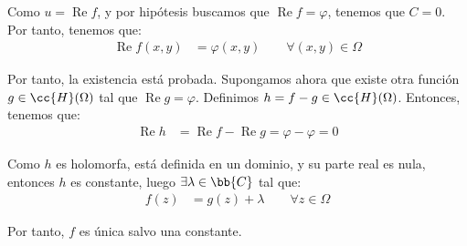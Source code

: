 \documentclass[12pt]{article}
\renewcommand{\Re}{\operatorname{Re}} %
\begin{document}
\begin{ejercicio}[3 puntos]
\begin{enumerate}
        Como $u=\Re f$, y por hipótesis buscamos que $\Re f = \varphi$, tenemos que $C=0$. Por tanto, tenemos que:
        \begin{align*}
            \Re f(x,y) &= \varphi(x,y)\qquad \forall (x,y) \in \Omega
        \end{align*}


        Por tanto, la existencia está probada. Supongamos ahora que existe otra función $g\in \cc{H}(\Omega)$ tal que $\Re g = \varphi$. Definimos $h = f - g\in \cc{H}(\Omega)$. Entonces, tenemos que:
        \begin{align*}
            \Re h &= \Re f - \Re g = \varphi - \varphi = 0
        \end{align*}

        Como $h$ es holomorfa, está definida en un dominio, y su parte real es nula, entonces $h$ es constante, luego $\exists \lambda \in \bb{C}$ tal que:
        \begin{align*}
            f(z) &= g(z) + \lambda\qquad \forall z \in \Omega
        \end{align*}

        Por tanto, $f$ es única salvo una constante.
    \end{enumerate}
    \end{ejercicio}
\end{document}
